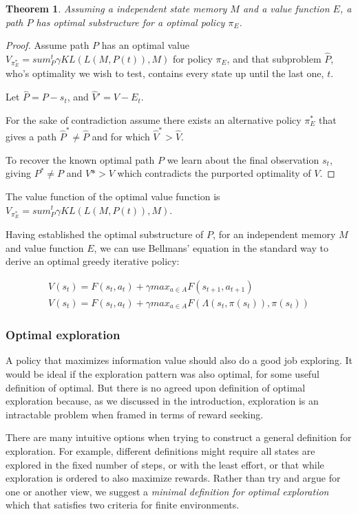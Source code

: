 \documentclass[9pt,twocolumn,twoside]{pnas-new}
\newtheorem{theorem}{Theorem}
\begin{document}
{{\begin{theorem}
    Assuming a independent state memory $M$ and a value function $E$, a path $P$ has optimal substructure for a optimal policy $\pi_E$.
\end{theorem}
\begin{proof}
    Assume path $P$ has an optimal value $V_{\pi_E^*} = sum^t_P \gamma KL(L(M, P(t)), M)$ for policy $\pi_E$, and that subproblem $\hat P$, who's optimality we wish to test, contains every state up until the last one, $t$. 
    
    Let $\hat P = P - s_t$, and $\hat V' = V - E_t$.

    For the sake of contradiction assume there exists an alternative policy $\pi_E^*$ that gives a path $\hat P^* \neq \hat P$ and for which $\hat V^* > \hat V$. 

    To recover the known optimal path $P$ we learn about the final observation $s_t$, giving $P^* \neq P$ and $V* > V$ which contradicts the purported optimality of $V$.
\end{proof}

The value function of the optimal value function is $V_{\pi_E^*} = sum^t_P \gamma KL(L(M, P(t)), M)$. 

Having established the optimal substructure of $P$, for an independent memory $M$ and value function $E$, we can use Bellmans' equation in the standard way to derive an optimal greedy iterative policy:

\begin{align}
    V(s_t) = F(s_t, a_t) + \gamma max_{a \in A} F(s_{t+1}, a_{t+1}) \\
    V(s_t) = F(s_t, a_t) + \gamma max_{a \in A} F(\Lambda(s_t, \pi(s_t)), \pi(s_t))
\end{align}


\subsubsection*{Optimal exploration}
A policy that maximizes information value should also do a good job exploring. It would be ideal if the exploration pattern was also optimal, for some useful definition of optimal. But there is no agreed upon definition of optimal exploration because, as we discussed in the introduction, exploration is an intractable problem when framed in terms of reward seeking. 

There are many intuitive options when trying to construct a general definition for exploration. For example, different definitions might require all states are explored in the fixed number of steps, or with the least effort, or that while exploration is ordered to also maximize rewards. Rather than try and argue for one or another view, we suggest a \textit{minimal definition for optimal exploration} which that satisfies two criteria for finite environments. 

}}
\end{document}
